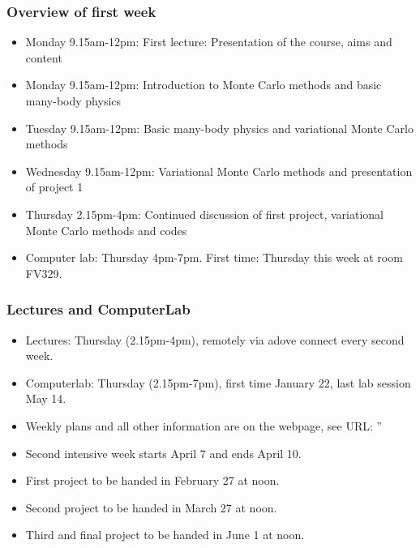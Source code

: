 \documentclass{beamer}
\begin{document}
\begin{frame}
\frametitle{Overview of first week}

\begin{block}{}
\begin{itemize}
  \item Monday 9.15am-12pm: First lecture: Presentation of the course, aims and content

  \item Monday 9.15am-12pm: Introduction to Monte Carlo methods and basic many-body physics

  \item Tuesday 9.15am-12pm: Basic many-body physics and variational Monte Carlo methods

  \item Wednesday 9.15am-12pm: Variational Monte Carlo methods and presentation of project 1

  \item Thursday 2.15pm-4pm: Continued discussion of first project, variational Monte Carlo methods and codes

  \item Computer lab: Thursday 4pm-7pm. First time: Thursday this week at room FV329.
\end{itemize}

\noindent
\end{block}
\end{frame}

\begin{frame}
\frametitle{Lectures and ComputerLab}

\begin{block}{}
\begin{itemize}
  \item Lectures: Thursday (2.15pm-4pm), remotely via adove connect every second week.

  \item Computerlab: Thursday (2.15pm-7pm), first time January 22, last lab session May 14.

  \item Weekly plans and all other information are on the webpage, see URL: ''

  \item Second intensive week starts April 7 and ends April 10.

  \item First project to be handed in February 27 at noon.

  \item Second project to be handed in March 27 at noon.

  \item Third and final project to be handed in June 1 at noon. 
\end{itemize}

\noindent
\end{block}
\end{frame}
\end{document}
